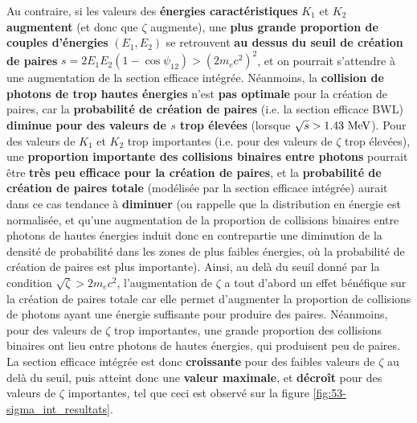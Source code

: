 \begin{refsection}
Au contraire, si les valeurs des \textbf{énergies caractéristiques} $K_1$ et $K_2$ \textbf{augmentent} (et donc que $\zeta$ augmente), une \textbf{plus grande proportion de couples d'énergies} $(E_1,E_2)$ se retrouvent \textbf{au dessus du seuil de création de paires} $s=2 E_1 E_2 (1- \cos{\psi_{12}}) > (2 m_e c^2)^2$, et on pourrait s'attendre à une augmentation de la section efficace intégrée. Néanmoins, la \textbf{collision de photons de trop hautes énergies} n'est \textbf{pas optimale} pour la création de paires, car la\textbf{ probabilité de création de paires} (i.e. la section efficace BWL) \textbf{diminue pour des valeurs de $s$ trop élevées} (lorsque $\sqrt{s}>1.43 ~ \rm MeV$). Pour des valeurs de $K_1$ et $K_2$ trop importantes (i.e. pour des valeurs de $\zeta$ trop élevées), une \textbf{proportion importante des collisions binaires entre photons} pourrait être \textbf{très peu efficace pour la création de paires}, et la \textbf{probabilité de création de paires totale} (modélisée par la section efficace intégrée) aurait dans ce cas tendance à \textbf{diminuer} (on rappelle que la distribution en énergie est normalisée, et qu'une augmentation de la proportion de collisions binaires entre photons de hautes énergies induit donc en contrepartie une diminution de la densité de probabilité dans les zones de plus faibles énergies, où la probabilité de création de paires est plus importante). 
Ainsi, au delà du seuil donné par la condition $\sqrt{\zeta}>2 m_e c^2$, l'augmentation de $\zeta$ a tout d'abord un effet bénéfique sur la création de paires totale car elle permet d'augmenter la proportion de collisions de photons ayant une énergie suffisante pour produire des paires. Néanmoins, pour des valeurs de $\zeta$ trop importantes, une grande proportion des collisions binaires ont lieu entre photons de hautes énergies, qui produisent peu de paires. La section efficace intégrée est donc \textbf{croissante} pour des faibles valeurs de $\zeta$ au delà du seuil, puis atteint donc une \textbf{valeur maximale}, et \textbf{décroît} pour des valeurs de $\zeta$ importantes, tel que ceci est observé sur la figure \ref{fig:53-sigma_int_resultats}.


\end{refsection}
